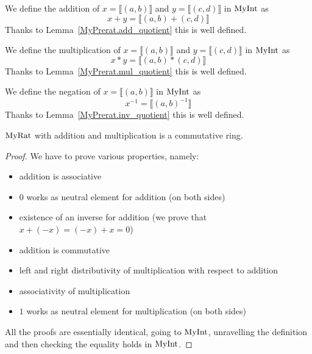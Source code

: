 \begin{definition}
    \label{MyRat.add}
    \leanok
We define the addition of $x = \llbracket (a, b) \rrbracket$ and $y = \llbracket (c, d) \rrbracket$ in $\mathrm{MyInt}$ as
\[
x + y = \llbracket (a,b)+(c,d) \rrbracket
\]
Thanks to Lemma~\ref{MyPrerat.add_quotient} this is well defined.
\end{definition}

\begin{definition}
    \label{MyRat.mul}
    \leanok
We define the multiplication of $x = \llbracket (a, b) \rrbracket$ and $y = \llbracket (c, d) \rrbracket$ in $\mathrm{MyInt}$ as
\[
x * y = \llbracket (a, b)*(c,d) \rrbracket
\]
Thanks to Lemma~\ref{MyPrerat.mul_quotient} this is well defined.
\end{definition}

\begin{definition}
    \label{MyRat.inv}
    \leanok
We define the negation of $x = \llbracket (a, b) \rrbracket$ in $\mathrm{MyInt}$ as
\[
x^{-1} = \llbracket (a, b)^{-1} \rrbracket
\]
Thanks to Lemma~\ref{MyPrerat.inv_quotient} this is well defined.
\end{definition}

\begin{proposition}
    \label{MyRat.commRing}
    \leanok
    $\mathrm{MyRat}$ with addition and multiplication is a commutative ring.
\end{proposition}
\begin{proof}
    \leanok
    We have to prove various properties, namely:
    \begin{itemize}
        \item addition is associative
        \item $0$ works as neutral element for addition (on both sides)
        \item existence of an inverse for addition (we prove that $x + (-x) = (-x) + x = 0$)
        \item addition is commutative
        \item left and right distributivity of multiplication with respect to addition
        \item associativity of multiplication
        \item $1$ works as neutral element for multiplication (on both sides)
    \end{itemize}
    All the proofs are essentially identical, going to $\mathrm{MyInt}$, unravelling the definition and then
    checking the equality holds in $\mathrm{MyInt}$.
\end{proof}